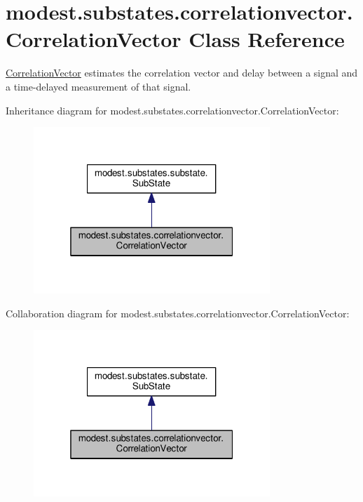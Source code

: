 \hypertarget{classmodest_1_1substates_1_1correlationvector_1_1CorrelationVector}{}\section{modest.\+substates.\+correlationvector.\+Correlation\+Vector Class Reference}
\label{classmodest_1_1substates_1_1correlationvector_1_1CorrelationVector}


\hyperlink{classmodest_1_1substates_1_1correlationvector_1_1CorrelationVector}{Correlation\+Vector} estimates the correlation vector and delay between a signal and a time-\/delayed measurement of that signal.  




Inheritance diagram for modest.\+substates.\+correlationvector.\+Correlation\+Vector\+:\nopagebreak
\begin{figure}[H]
\begin{center}
\leavevmode
\includegraphics[width=253pt]{classmodest_1_1substates_1_1correlationvector_1_1CorrelationVector__inherit__graph}
\end{center}
\end{figure}


Collaboration diagram for modest.\+substates.\+correlationvector.\+Correlation\+Vector\+:\nopagebreak
\begin{figure}[H]
\begin{center}
\leavevmode
\includegraphics[width=253pt]{classmodest_1_1substates_1_1correlationvector_1_1CorrelationVector__coll__graph}
\end{center}
\end{figure}
